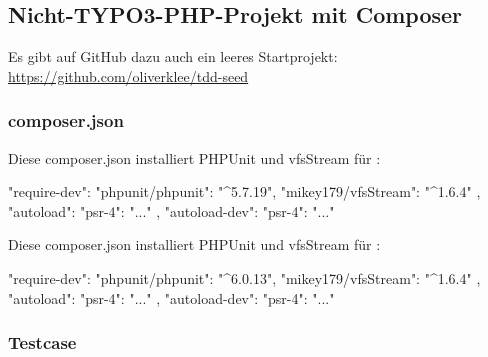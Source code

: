 \documentclass[a4paper,11pt,headsepline]{scrartcl}
\begin{document}
\subsection{Nicht-TYPO3-PHP-Projekt mit Composer}

Es gibt auf GitHub dazu auch ein leeres Startprojekt:\\
\url{https://github.com/oliverklee/tdd-seed}

\subsubsection{composer.json}

Diese composer.json installiert PHPUnit und vfsStream für :

\begin{jsoncode}
{
    "require-dev": {
        "phpunit/phpunit": "^5.7.19",
        "mikey179/vfsStream": "^1.6.4"
    },
    "autoload": {
        "psr-4": {
            "..."
        }
    },
    "autoload-dev": {
        "psr-4": {
            "..."
        }
    }
}
\end{jsoncode}

Diese composer.json installiert PHPUnit und vfsStream für :

\begin{jsoncode}
{
    "require-dev": {
        "phpunit/phpunit": "^6.0.13",
        "mikey179/vfsStream": "^1.6.4"
    },
    "autoload": {
        "psr-4": {
            "..."
        }
    },
    "autoload-dev": {
        "psr-4": {
            "..."
        }
    }
}
\end{jsoncode}

\subsubsection{Testcase}
\end{document}
